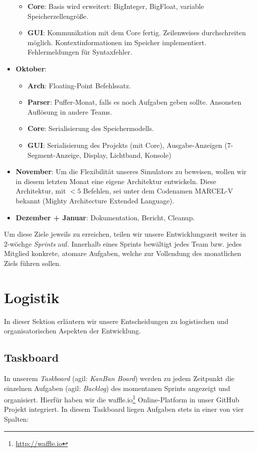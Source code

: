 \begin{itemize}
\begin{itemize}
      \item \textbf{Core}: Basis wird erweitert: BigInteger, BigFloat, variable Speicherzellengröße.
      \item \textbf{GUI}: Kommunikation mit dem Core fertig. Zeilenweises
        durchschreiten möglich. Kontextinformationen im Speicher
        implementiert. Fehlermeldungen für Syntaxfehler.
    \end{itemize}
  \item \textbf{Oktober}:
    \begin{itemize}
      \item \textbf{Arch}: Floating-Point Befehlssatz.
      \item \textbf{Parser}: Puffer-Monat, falls es noch Aufgaben geben
        sollte. Ansonsten Auflösung in andere Teams.
      \item \textbf{Core}: Serialisierung des Speichermodells.
      \item \textbf{GUI}: Serialisierung des Projekts (mit Core), Ausgabe-Anzeigen (7-Segment-Anzeige, Display, Lichtband, Konsole)
    \end{itemize}
  \item \textbf{November}: Um die Flexibilität unseres Simulators zu beweisen,
    wollen wir in diesem letzten Monat eine eigene Architektur entwickeln. Diese
    Architektur, mit $< 5$ Befehlen, sei unter dem Codenamen MARCEL-V bekannt
    (Mighty Architecture Extended Language).
  \item \textbf{Dezember + Januar}: Dokumentation, Bericht, Cleanup.
\end{itemize}


Um diese Ziele jeweils zu erreichen, teilen wir unsere Entwicklungszeit weiter
in 2-wöchge \emph{Sprints} auf. Innerhalb eines Sprints bewältigt jedes Team
bzw. jedes Mitglied konkrete, atomare Aufgaben, welche zur Vollendung des
monatlichen Ziels führen sollen.

\section{Logistik}

In dieser Sektion erläutern wir unsere Entscheidungen zu logistischen und
organisatorischen Aspekten der Entwicklung.

\subsection{Taskboard}

In unserem \emph{Taskboard} (agil: \emph{KanBan Board}) werden zu jedem
Zeitpunkt die einzelnen Aufgaben (agil: \emph{Backlog}) des momentanen Sprints
angezeigt und organisiert. Hierfür haben wir die
waffle.io\footnote{\url{http://waffle.io}} Online-Platform in unser GitHub
Projekt integriert. In diesem Taskboard liegen Aufgaben stets in einer von vier
Spalten:

